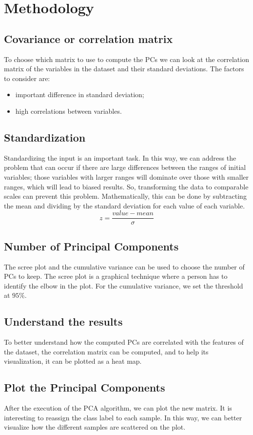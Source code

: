 \documentclass[../main.tex]{subfiles}
\begin{document}
\chapter{Methodology}

\section{Covariance or correlation matrix}
To choose which matrix to use to compute the PCs we can look at the correlation matrix of the variables in the dataset and their standard deviations. The factors to consider are:
\begin{itemize}
    \item important difference in standard deviation;
    \item high correlations between variables.
\end{itemize}

\section{Standardization}
Standardizing the input is an important task. In this way, we can address the problem that can occur if there are large differences between the ranges of initial variables; those variables with larger ranges will dominate over those with smaller ranges, which will lead to biased results. So, transforming the data to comparable scales can prevent this problem. Mathematically, this can be done by subtracting the mean and dividing by the standard deviation for each value of each variable.
\begin{equation}
    z = \frac{value - mean}{\sigma}
\end{equation}

\section{Number of Principal Components}
The scree plot and the cumulative variance can be used to choose the number of PCs to keep. The scree plot is a graphical technique where a person has to identify the elbow in the plot. For the cumulative variance, we set the threshold at $95\%$.

\section{Understand the results}
To better understand how the computed PCs are correlated with the features of the dataset, the correlation matrix can be computed, and to help its visualization, it can be plotted as a heat map.

\section{Plot the Principal Components}
After the execution of the PCA algorithm, we can plot the new matrix. It is interesting to reassign the class label to each sample. In this way, we can better visualize how the different samples are scattered on the plot.
\end{document}
